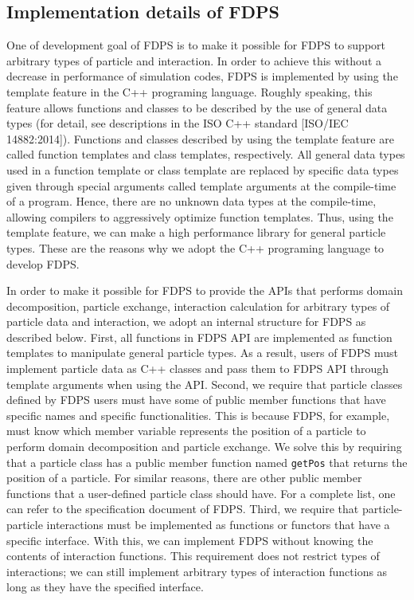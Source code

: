 \documentclass[proof,useamsfonts]{pasj01}
\begin{document}
\subsection{Implementation details of FDPS}
\label{subsec:fdps_impl}
One of development goal of FDPS is to make it possible for FDPS to support arbitrary types of particle and interaction. In order to achieve this without a decrease in performance of simulation codes, FDPS is implemented by using the template feature in the C++ programing language. Roughly speaking, this feature allows functions and classes to be described by the use of general data types (for detail, see descriptions in the ISO C++ standard [ISO/IEC 14882:2014]). Functions and classes described by using the template feature are called function templates and class templates, respectively. All general data types used in a function template or class template are replaced by specific data types given through special arguments called template arguments at the compile-time of a program. Hence, there are no unknown data types at the compile-time, allowing compilers to aggressively optimize function templates. Thus, using the template feature, we can make a high performance library for general particle types. These are the reasons why we adopt the C++ programing language to develop FDPS.

In order to make it possible for FDPS to provide the APIs that performs domain decomposition, particle exchange, interaction calculation for arbitrary types of particle data and interaction, we adopt an internal structure for FDPS as described below. First, all functions in FDPS API are implemented as function templates to manipulate general particle types. As a result, users of FDPS must implement particle data as C++ classes and pass them to FDPS API through template arguments when using the API. Second, we require that particle classes defined by FDPS users must have some of public member functions that have specific names and specific functionalities. This is because FDPS, for example, must know which member variable represents the position of a particle to perform  domain decomposition and particle exchange. We solve this by requiring that a particle class has a public member function named \texttt{getPos} that returns the position of a particle. For similar reasons, there are other public member functions that a user-defined particle class should have. For a complete list, one can refer to the specification document of FDPS. Third, we require that particle-particle interactions must be implemented as functions or functors that have a specific interface. With this, we can implement FDPS without knowing the contents of interaction functions. This requirement does not restrict types of interactions; we can still implement arbitrary types of interaction functions as long as they have the specified interface.
 
\end{document}
